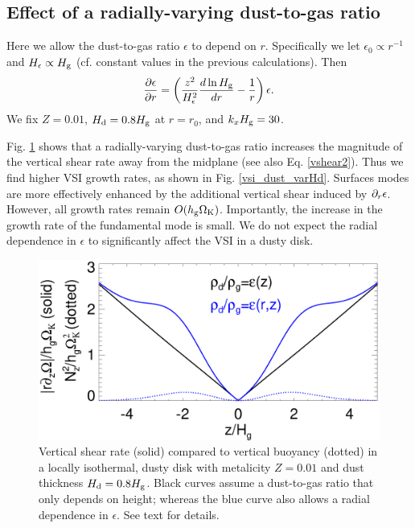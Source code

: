 \subsection{Effect of a radially-varying dust-to-gas ratio}\label{varHd}

Here we allow the dust-to-gas ratio $\epsilon$ to depend on
$r$. Specifically we let $\epsilon_0\propto r^{-1}$ and
$H_\epsilon \propto H_\mathrm{g}$ (cf. constant values in the previous
calculations). Then
\begin{align*}
  \frac{\partial\epsilon}{\partial r} =
  \left(\frac{z^2}{H_\epsilon^2}\frac{d\ln{H_\mathrm{g}}}{dr} -
    \frac{1}{r}\right)\epsilon.   
\end{align*}
We fix $Z=0.01$, $H_\mathrm{d}=0.8H_\mathrm{g}$ at $r=r_0$, and
$k_xH_\mathrm{g}=30$.      

Fig. \ref{compare_vshear_varHd} shows that a radially-varying
dust-to-gas ratio increases the magnitude of the vertical shear rate
away from the midplane (see also Eq. \ref{vshear2}). Thus we find
higher VSI growth rates, as shown in Fig. \ref{vsi_dust_varHd}. 
Surfaces modes are more effectively enhanced by the additional vertical 
shear induced by $\partial_r\epsilon$. However, all growth rates remain
$O(h_\mathrm{g}\Omega_{\rm K})$. Importantly, the increase in the growth rate of the
fundamental mode is small. We do not expect the radial
dependence in $\epsilon$ to significantly affect the VSI in a dusty
disk. 

\begin{figure}
  \includegraphics[width=\linewidth]{figures/compare_vshear_Nz2_varHd} 
  \caption{Vertical shear rate (solid) compared to vertical buoyancy
    (dotted) in a locally isothermal, dusty disk 
    with metalicity $Z=0.01$ and dust thickness $H_\mathrm{d}=0.8H_\mathrm{g}$.
    Black curves assume a dust-to-gas ratio that only depends on
    height; whereas the blue curve also allows a radial dependence in
    $\epsilon$. See text for details.  
    \label{compare_vshear_varHd}
    }
\end{figure}



